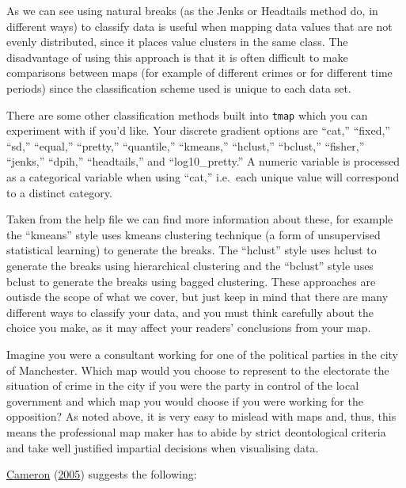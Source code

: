 \documentclass[
]{book}
\begin{document}
As we can see using natural breaks (as the Jenks or Headtails method do, in different ways) to classify data is useful when mapping data values that are not evenly distributed, since it places value clusters in the same class. The disadvantage of using this approach is that it is often difficult to make comparisons between maps (for example of different crimes or for different time periods) since the classification scheme used is unique to each data set.

There are some other classification methods built into \texttt{tmap} which you can experiment with if you'd like. Your discrete gradient options are ``cat,'' ``fixed,'' ``sd,'' ``equal,'' ``pretty,'' ``quantile,'' ``kmeans,'' ``hclust,'' ``bclust,'' ``fisher,'' ``jenks,'' ``dpih,'' ``headtails,'' and ``log10\_pretty.'' A numeric variable is processed as a categorical variable when using ``cat,'' i.e.~each unique value will correspond to a distinct category.

Taken from the help file we can find more information about these, for example the ``kmeans'' style uses kmeans clustering technique (a form of unsupervised statistical learning) to generate the breaks. The ``hclust'' style uses hclust to generate the breaks using hierarchical clustering and the ``bclust'' style uses bclust to generate the breaks using bagged clustering. These approaches are outisde the scope of what we cover, but just keep in mind that there are many different ways to classify your data, and you must think carefully about the choice you make, as it may affect your readers' conclusions from your map.

Imagine you were a consultant working for one of the political parties in the city of Manchester. Which map would you choose to represent to the electorate the situation of crime in the city if you were the party in control of the local government and which map you would choose if you were working for the opposition? As noted above, it is very easy to mislead with maps and, thus, this means the professional map maker has to abide by strict deontological criteria and take well justified impartial decisions when visualising data.

\protect\hyperlink{ref-Cameron_2005}{Cameron} (\protect\hyperlink{ref-Cameron_2005}{2005}) suggests the following:
\end{document}
